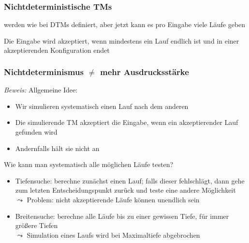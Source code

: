 \documentclass[onlymath]{beamer}
\begin{document}
\begin{frame}\frametitle{Nichtdeterministische TMs}

\medskip

 werden wie bei DTMs definiert, aber jetzt kann es pro Eingabe viele Läufe geben
\medskip

Die Eingabe wird akzeptiert, wenn mindestens ein Lauf endlich ist und in einer akzeptierenden Konfiguration endet

\end{frame}

\begin{frame}[t]\frametitle{Nichtdeterminismus $\neq$ mehr Ausdrucksstärke}

\pause

\emph{Beweis:} Allgemeine Idee:
\begin{itemize}
\item Wir simulieren systematisch einen Lauf nach dem anderen
\item Die simulierende TM akzeptiert die Eingabe, wenn ein akzeptierender Lauf gefunden wird
\item Andernfalls hält sie nicht an
\end{itemize}\pause

\alert{Wie kann man systematisch alle möglichen Läufe testen?}
\begin{itemize}
\item Tiefensuche: berechne zunächst einen Lauf; falls dieser fehlschlägt, dann gehe zum letzten Entscheidungspunkt zurück und teste eine andere Möglichkeit\\\pause
$\leadsto$ Problem: nicht akzeptierende Läufe können unendlich sein\pause
%
\item Breitensuche: berechne alle Läufe bis zu einer gewissen Tiefe, für immer größere Tiefen\\
$\leadsto$ Simulation eines Laufs wird bei Maximaltiefe abgebrochen
\end{itemize}

\end{frame}
\end{document}
